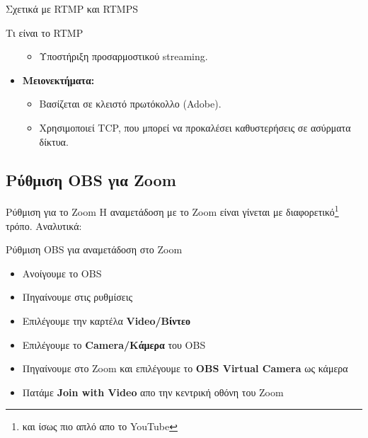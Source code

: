 \documentclass[aspectratio=169]{beamer}
\begin{document}
\begin{frame}[allowframebreaks]{Σχετικά με RTMP και RTMPS}
\begin{exampleblock}{Τι είναι το RTMP}
\begin{itemize}
\begin{itemize}
              \item Υποστήριξη προσαρμοστικού streaming.
          \end{itemize}
      \item \textbf{Μειονεκτήματα:}
          \begin{itemize}
              \item Βασίζεται σε κλειστό πρωτόκολλο (Adobe).
              \item Χρησιμοποιεί TCP, που μπορεί να προκαλέσει καθυστερήσεις σε ασύρματα δίκτυα.
          \end{itemize}
  \end{itemize}
  \end{exampleblock}
\end{frame}
\subsection{Ρύθμιση OBS για Zoom}
\begin{frame}{Ρύθμιση  για το Zoom}
  Η αναμετάδοση με το Zoom είναι γίνεται με διαφορετικό\footnote{και ίσως πιο απλό απο το YouTube} τρόπο. Αναλυτικά:
  \begin{block}
    {Ρύθμιση OBS για αναμετάδοση στο Zoom}
    \begin{itemize}
      \item Ανοίγουμε το OBS
      \item Πηγαίνουμε στις ρυθμίσεις
      \item Επιλέγουμε την καρτέλα \textbf{Video/Βίντεο}
      \item Επιλέγουμε το \textbf{Camera/Κάμερα} του OBS
      \item Πηγαίνουμε στο Zoom και επιλέγουμε το \textbf{OBS Virtual Camera} ως κάμερα
      \item Πατάμε \textbf{Join with Video} απο την κεντρική οθόνη του Zoom
    \end{itemize}
  \end{block}
\end{frame}
\end{document}
